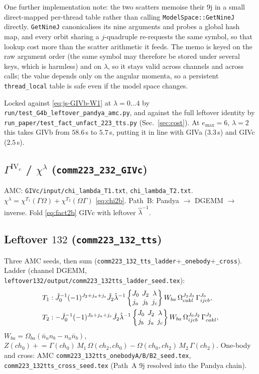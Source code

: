 \documentclass[enabledeprecatedfontcommands]{scrartcl}
\newcommand{\codename}[1]{\texttt{#1}}
\newcommand{\sixj}[6]{\begingroup\setlength{\arraycolsep}{0.2em}%
  \begin{Bmatrix} #1 & #2 & #3 \\ #4 & #5 & #6 \end{Bmatrix}\endgroup}
\begin{document}
One further implementation note: the two scatters memoise their 9j in
a small direct-mapped per-thread table rather than calling
\codename{ModelSpace::GetNineJ} directly. \codename{GetNineJ}
canonicalises its nine arguments and probes a global hash map, and
every orbit sharing a $j$-quadruple re-requests the same symbol, so
that lookup cost more than the scatter arithmetic it feeds. The memo
is keyed on the raw argument order (the same symbol may therefore be
stored under several keys, which is harmless) and on $\lambda$, so it
stays valid across channels and across calls; the value depends only
on the angular momenta, so a persistent \codename{thread\_local} table
is safe even if the model space changes.

Locked against \eqref{eq:js-GIVb-W1} at $\lambda=0\ldots4$ by
\codename{run/test\_G4b\_leftover\_pandya\_amc.py}, and against the
full leftover identity by
\codename{run\_paper/test\_fact\_unfact\_223\_tts.py}
(Sec.~\ref{sec:cost}). At $e_{\max}=6$, $\lambda=2$ this takes GIVb
from $58.6$\,s to $5.7$\,s, putting it in line with GIVa ($3.3$\,s)
and GIVc ($2.5$\,s).

\subsection{$\Gamma^{\mathrm{IV}_c}$ / $\chi^\lambda$
(\codename{comm223\_232\_GIVc})}
\label{sec:js-GIVc}

AMC: \codename{GIVc/input/chi\_lambda\_T1.txt},
\codename{chi\_lambda\_T2.txt}.
$\chi^\lambda=\chi^{T_1}(\Gamma\Omega)+\chi^{T_2}(\Omega\Gamma)$
\eqref{eq:chi2b}. Path~B: Pandya $\to$ DGEMM $\to$ inverse.
Fold \eqref{eq:fact2b} GIVc with leftover $\hat\lambda^{-1}$.

\subsection{Leftover $132$
(\codename{comm223\_132\_tts})}
\label{sec:js-132}

Three AMC seeds, then sum
(\codename{comm223\_132\_tts\_ladder}+\codename{\_onebody}+\codename{\_cross}).
Ladder (channel DGEMM, \codename{leftover132/output/comm223\_132tts\_ladder\_seed.tex}):
\begin{equation}\label{eq:js-132-lad}
\begin{aligned}
T_1&:
\hat J_0^{-1}(-1)^{J_2+j_a+j_c}\hat J_2\hat\lambda^{-1}
\sixj{J_0}{J_2}{\lambda}{j_a}{j_b}{j_c}
W_{ba}\,\Omega^{J_2 J_0}_{cakl}\,\Gamma^{J_0}_{ijcb},\\
T_2&:
-\hat J_0^{-1}(-1)^{J_0+j_a+j_c}\hat J_2\hat\lambda^{-1}
\sixj{J_0}{J_2}{\lambda}{j_b}{j_a}{j_c}
W_{ba}\,\Omega^{J_0 J_2}_{ijcb}\,\Gamma^{J_2}_{cakl},
\end{aligned}
\end{equation}
$W_{ba}=\Omega_{ba}(\bar n_a n_b-n_a\bar n_b)$,
$Z(ch_0)\mathrel{+}=\Gamma(ch_0)\,M_1\,\Omega(ch_2,ch_0)
-\Omega(ch_0,ch_2)\,M_2\,\Gamma(ch_2)$.
One-body and cross: AMC
\codename{comm223\_132tts\_onebodyA/B/B2\_seed.tex},
\codename{comm223\_132tts\_cross\_seed.tex}
(Path~A 9j resolved into the Pandya chain).
\end{document}
